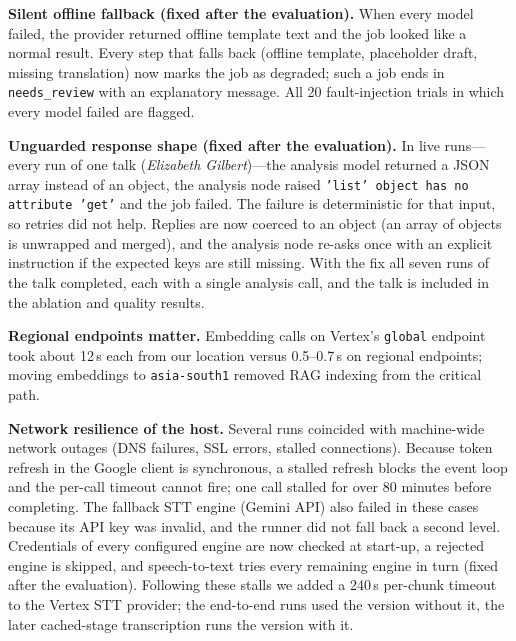 \textbf{Silent offline fallback (fixed after the evaluation).} When every model failed, the
provider returned offline template text and the job looked like a normal result. Every step
that falls back (offline template, placeholder draft, missing translation) now marks the job
as degraded; such a job ends in \texttt{needs\_review} with an explanatory message. All 20
fault-injection trials in which every model failed are flagged.

\textbf{Unguarded response shape (fixed after the evaluation).} In
\LiveAnalysisShapeFailures{} live runs---every run of one talk (\emph{Elizabeth Gilbert})---the
analysis model returned a JSON array instead of an object, the analysis node raised
\texttt{'list' object has no attribute 'get'} and the job failed. The failure is deterministic
for that input, so retries did not help. Replies are now coerced to an object (an array of
objects is unwrapped and merged), and the analysis node re-asks once with an explicit
instruction if the expected keys are still missing. With the fix all seven runs of the talk
completed, each with a single analysis call, and the talk is included in the ablation and
quality results.

\textbf{Regional endpoints matter.} Embedding calls on Vertex's \texttt{global} endpoint took
about 12\,s each from our location versus 0.5--0.7\,s on regional endpoints; moving
embeddings to \texttt{asia-south1} removed RAG indexing from the critical path.

\textbf{Network resilience of the host.} Several runs coincided with machine-wide network
outages (DNS failures, SSL errors, stalled connections). Because token refresh in the
Google client is synchronous, a stalled refresh blocks the event loop and the per-call
timeout cannot fire; one call stalled for over 80 minutes before completing. The fallback
STT engine (Gemini API) also failed in these cases because its API key was invalid, and the
runner did not fall back a second level. Credentials of every configured engine are now
checked at start-up, a rejected engine is skipped, and speech-to-text tries every remaining
engine in turn (fixed after the evaluation). Following these stalls we added a 240\,s per-chunk timeout to
the Vertex STT provider; the end-to-end runs used the version without it, the later
cached-stage transcription runs the version with it.

